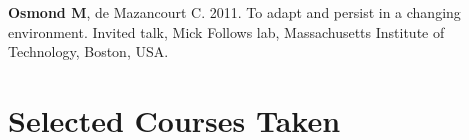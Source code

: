 \documentclass[12pt]{article}
\begin{document}
\textbf{Osmond M}, de Mazancourt C. 2011. To adapt and persist in a changing environment. Invited talk, Mick Follows lab, Massachusetts Institute of Technology, Boston, USA.









\section*{Selected Courses Taken}
\end{document}
